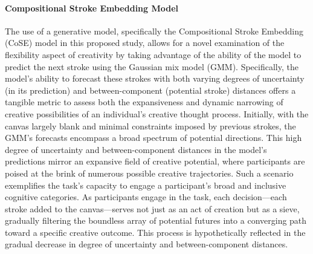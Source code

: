 \documentclass[../Proposal.tex]{subfiles}
\begin{document}
\paragraph*{Compositional Stroke Embedding Model}
The use of a generative model, specifically the Compositional Stroke Embedding (CoSE) model in this proposed study, allows for a novel examination of the flexibility aspect of creativity by taking advantage of the ability of the model to predict the next stroke using the Gaussian mix model (GMM). Specifically, the model's ability to forecast these strokes with both varying degrees of uncertainty (in its prediction) and between-component (potential stroke) distances offers a tangible metric to assess both the expansiveness and dynamic narrowing of creative possibilities of an individual's creative thought process. Initially, with the canvas largely blank and minimal constraints imposed by previous strokes, the GMM's forecasts encompass a broad spectrum of potential directions. This high degree of uncertainty and between-component distances in the model's predictions mirror an expansive field of creative potential, where participants are poised at the brink of numerous possible creative trajectories. Such a scenario exemplifies the task's capacity to engage a participant's broad and inclusive cognitive categories. As participants engage in the task, each decision—each stroke added to the canvas—serves not just as an act of creation but as a sieve, gradually filtering the boundless array of potential futures into a converging path toward a specific creative outcome. This process is hypothetically reflected in the gradual decrease in degree of uncertainty and between-component distances.
\end{document}
